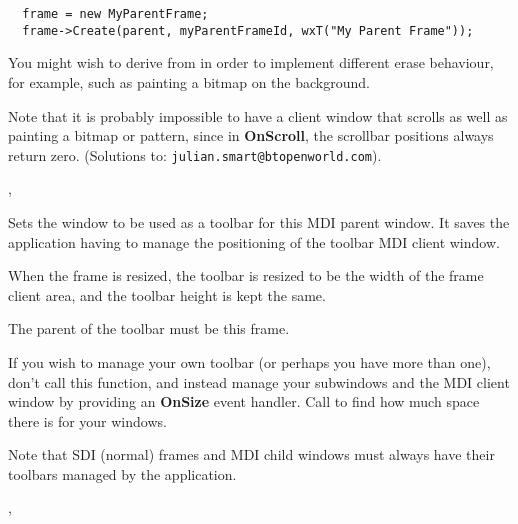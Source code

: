 \begin{verbatim}
  frame = new MyParentFrame;
  frame->Create(parent, myParentFrameId, wxT("My Parent Frame"));
\end{verbatim}


You might wish to derive from  in order
to implement different erase behaviour, for example, such as painting a bitmap
on the background.

Note that it is probably impossible to have a client window that scrolls as well as painting
a bitmap or pattern, since in {\bf OnScroll}, the scrollbar positions always return zero.
(Solutions to: {\tt julian.smart@btopenworld.com}).


,\rtfsp
{}

\label{wxmdiparentframesettoolbar}


Sets the window to be used as a toolbar for this
MDI parent window. It saves the application having to manage the positioning
of the toolbar MDI client window.




When the frame is resized, the toolbar is resized to be the width of
the frame client area, and the toolbar height is kept the same.

The parent of the toolbar must be this frame.

If you wish to manage your own toolbar (or perhaps you have more than one),
don't call this function, and instead manage your subwindows and the MDI client window by
providing an {\bf OnSize} event handler. Call  to
find how much space there is for your windows.

Note that SDI (normal) frames and MDI child windows must always have their
toolbars managed by the application.


,\rtfsp
{}

